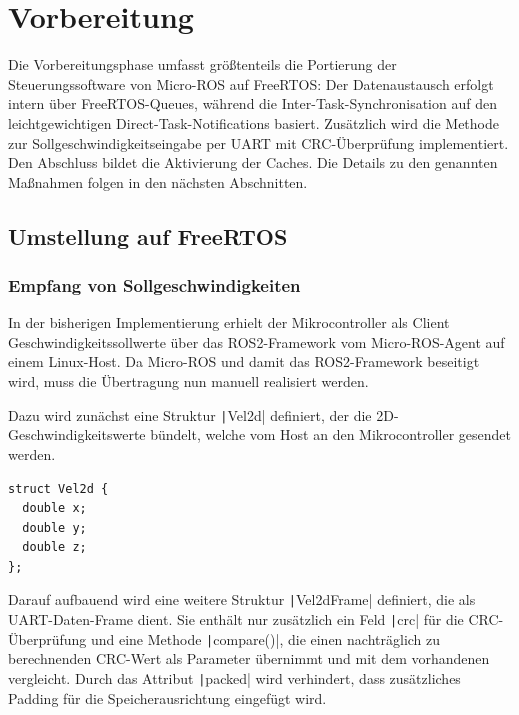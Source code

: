 \section{Vorbereitung}

Die Vorbereitungsphase umfasst größtenteils die Portierung der
Steuerungssoftware von Micro-ROS auf FreeRTOS: Der Datenaustausch erfolgt intern
über FreeRTOS-Queues, während die Inter-Task-Synchronisation auf den
leichtgewichtigen Direct-Task-Notifications basiert. Zusätzlich wird die Methode
zur Sollgeschwindigkeitseingabe per UART mit CRC-Überprüfung implementiert. Den
Abschluss bildet die Aktivierung der Caches. Die Details zu den genannten
Maßnahmen folgen in den nächsten Abschnitten.

\subsection{Umstellung auf FreeRTOS}

\subsubsection{Empfang von Sollgeschwindigkeiten}

In der bisherigen Implementierung erhielt der Mikrocontroller als Client
Geschwindigkeitssollwerte über das ROS2-Framework vom Micro-ROS-Agent auf einem
Linux-Host. Da Micro-ROS und damit das ROS2-Framework beseitigt wird, muss die
Übertragung nun manuell realisiert werden.

Dazu wird zunächst eine Struktur \texttt|Vel2d| definiert, der die
2D-Geschwindigkeitswerte bündelt, welche vom Host an den Mikrocontroller
gesendet werden.

\begin{code}
\begin{verbatim}
struct Vel2d {
  double x;
  double y;
  double z;
};
\end{verbatim}
\end{code}

Darauf aufbauend wird eine weitere Struktur \texttt|Vel2dFrame|
definiert, die als UART-Daten-Frame dient. Sie enthält nur zusätzlich ein Feld
\texttt|crc| für die CRC-Überprüfung und eine Methode
\texttt|compare()|, die einen nachträglich zu berechnenden CRC-Wert als
Parameter übernimmt und mit dem vorhandenen vergleicht. Durch das Attribut
\texttt|packed| wird verhindert, dass zusätzliches Padding für die
Speicherausrichtung eingefügt wird.

